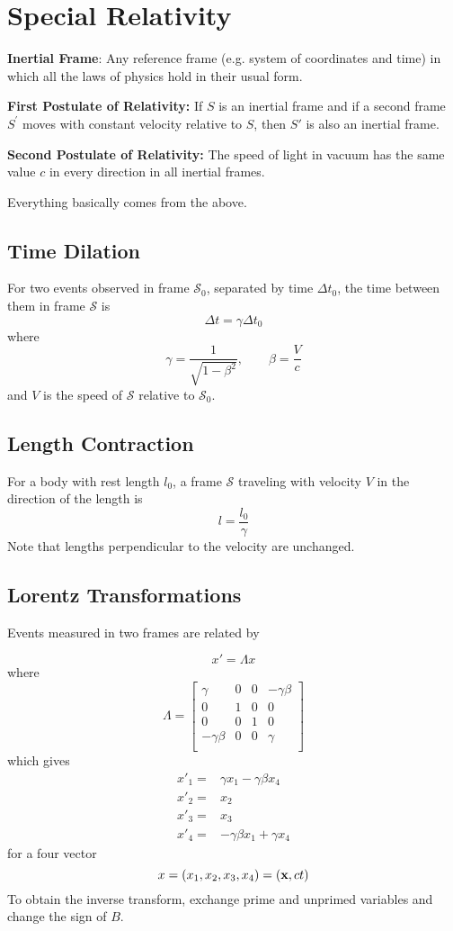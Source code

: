 \documentclass{article}
\begin{document}
\section{Special Relativity}

\textbf{Inertial Frame}: Any reference frame (e.g. system of coordinates and time) in which all the laws of physics hold in their usual form.

\textbf{First Postulate of Relativity:} If $S$ is an inertial frame and if a second frame $S^'$ moves with constant velocity relative to $S$, then $S'$ is also an inertial frame.

\textbf{Second Postulate of Relativity:} The speed of light in vacuum has the same value $c$ in every direction in all inertial frames.

Everything basically comes from the above.
\subsection{Time Dilation}
For two events observed in frame $\mathcal{S}_0$, separated by time $\Delta t_0$, the time between them in frame $\mathcal{S}$ is
$$
\Delta t = \gamma \Delta t_0
$$
where
$$
\gamma = \frac{1}{\sqrt{1-\beta^2}}, \qquad \beta = \frac{V}{c}
$$
and $V$ is the speed of $\mathcal{S}$ relative to $\mathcal{S}_0$.

\subsection{Length Contraction}
For a body with rest length $l_0$, a frame $\mathcal{S}$ traveling with velocity $V$ in the direction of the length is 
$$
l = \frac{l_0}{\gamma}
$$
Note that lengths perpendicular to the velocity are unchanged.

\subsection{Lorentz Transformations}

Events measured in two frames are related by 

$$
x' = \Lambda x
$$
where 
$$
\Lambda = \begin{bmatrix}
    \gamma & 0 & 0 & -\gamma \beta \\
    0 & 1 & 0 & 0 \\
    0 & 0 & 1 & 0 \\
    -\gamma \beta & 0 & 0 & \gamma \\
  \end{bmatrix}
$$
which gives 
\begin{align*}
    x'_1 = & \gamma x_1 - \gamma \beta x_4 \\
    x'_2 = & x_2 \\
    x'_3 = & x_3 \\
    x'_4 = & -\gamma \beta x_1 + \gamma x_4 
\end{align*}
for a four vector $$x = (x_1, x_2, x_3, x_4) = (\vb{x}, ct)$$ To obtain the inverse transform, exchange prime and unprimed variables and change the sign of $B$.  
\end{document}
